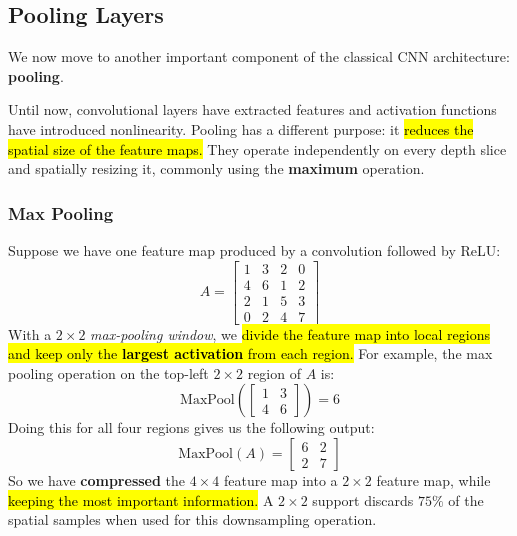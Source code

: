 \subsection{Pooling Layers}\label{sec:pooling-layers}

We now move to another important component of the classical CNN architecture: \textbf{pooling}.

\highspace
Until now, convolutional layers have extracted features and activation functions have introduced nonlinearity. Pooling has a different purpose: it \hl{reduces the spatial size of the feature maps.} They operate independently on every depth slice and spatially resizing it, commonly using the \textbf{maximum} operation.

\longline

\subsubsection{Max Pooling}\label{sec:max-pooling}

Suppose we have one feature map produced by a convolution followed by ReLU:
\begin{equation*}
    A = \begin{bmatrix}
        1 & 3 & 2 & 0 \\
        4 & 6 & 1 & 2 \\
        2 & 1 & 5 & 3 \\
        0 & 2 & 4 & 7
    \end{bmatrix}
\end{equation*}
With a $2 \times 2$ \emph{max-pooling window}, we \hl{divide the feature map into local regions and keep only the \textbf{largest activation} from each region.} For example, the max pooling operation on the top-left $2 \times 2$ region of $A$ is:
\begin{equation*}
    \mathrm{MaxPool}\left(\begin{bmatrix}
        1 & 3 \\
        4 & 6
    \end{bmatrix}\right) = 6
\end{equation*}
Doing this for all four regions gives us the following output:
\begin{equation*}
    \mathrm{MaxPool}(A) = \begin{bmatrix}
        6 & 2 \\
        2 & 7
    \end{bmatrix}
\end{equation*}
So we have \textbf{compressed} the $4 \times 4$ feature map into a $2 \times 2$ feature map, while \hl{keeping the most important information.} A $2 \times 2$ support discards $75\%$ of the spatial samples when used for this downsampling operation.

